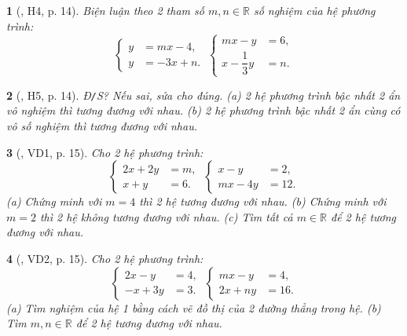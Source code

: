 \documentclass{article}
\newtheorem{baitoan}{}
\begin{document}
\begin{baitoan}[\cite{Binh_boi_duong_Toan_9_tap_2}, H4, p. 14]
	Biện luận theo 2 tham số $m,n\in\mathbb{R}$ số nghiệm của hệ phương trình:
	\begin{equation*}
		\left\{\begin{split}
			y &= mx - 4,\\
			y &= -3x + n.
		\end{split}\right.\ 
		\left\{\begin{split}
			mx - y &= 6,\\
			x - \dfrac{1}{3}y &= n.
		\end{split}\right.
	\end{equation*}
\end{baitoan}

\begin{baitoan}[\cite{Binh_boi_duong_Toan_9_tap_2}, H5, p. 14]
	{\rm Đ{\tt/}S?} Nếu sai, sửa cho đúng. (a) 2 hệ phương trình bậc nhất 2 ẩn vô nghiệm thì tương đương với nhau. (b) 2 hệ phương trình bậc nhất 2 ẩn cùng có vô số nghiệm thì tương đương với nhau.
\end{baitoan}

\begin{baitoan}[\cite{Binh_boi_duong_Toan_9_tap_2}, VD1, p. 15]
	Cho 2 hệ phương trình:
	\begin{equation*}
		\left\{\begin{split}
			2x + 2y &= m,\\
			x + y &= 6.
		\end{split}\right.\ 
		\left\{\begin{split}
			x - y &= 2,\\
			mx - 4y &= 12.
		\end{split}\right.
	\end{equation*}
	(a) Chứng minh với $m = 4$ thì 2 hệ tương đương với nhau. (b) Chứng minh với $m = 2$ thì 2 hệ không tương đương với nhau. (c) Tìm tất cả $m\in\mathbb{R}$ để 2 hệ tương đương với nhau.
\end{baitoan}

\begin{baitoan}[\cite{Binh_boi_duong_Toan_9_tap_2}, VD2, p. 15]
	Cho 2 hệ phương trình:
	\begin{equation*}
		\left\{\begin{split}
			2x - y &= 4,\\
			-x + 3y &= 3.
		\end{split}\right.\ 
		\left\{\begin{split}
			mx - y &= 4,\\
			2x + ny &= 16.
		\end{split}\right.
	\end{equation*}
	(a) Tìm nghiệm của hệ 1 bằng cách vẽ đồ thị của 2 đường thẳng trong hệ. (b) Tìm $m,n\in\mathbb{R}$ để 2 hệ tương đương với nhau.
\end{baitoan}
\end{document}
